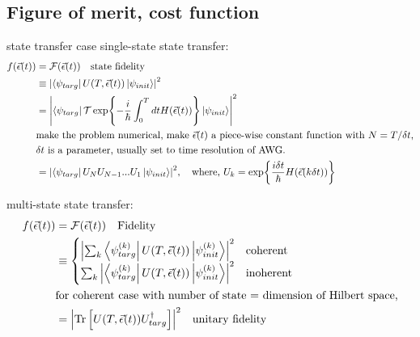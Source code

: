 \documentclass[12pt]{article}
\begin{document}
\subsection{Figure of merit, cost function}\label{sec:figure_of_merit}
state transfer case
single-state state transfer: 
\begin{align*}
    f(\vec{\epsilon}(t)) &= \mathcal{F}(\vec{\epsilon}(t)) \quad \text{state fidelity}\\
    &\equiv \abs{\bra{\psi_{targ}} U(T,\vec{\epsilon}(t)) \ket{\psi_{init}}}^2 \\
    &= \abs{\bra{\psi_{targ}} 
        \mathcal{T}\exp{-\frac{i}{\hbar}\int_0^T dt H(\vec{\epsilon}(t))}
        \ket{\psi_{init}}}^2 \\
    &\text{make the problem numerical, make $\vec{\epsilon}(t)$ a piece-wise constant function with $N=T/\delta t$,} \\
    &\text{$\delta t$ is a parameter, usually set to time resolution of AWG.} \\
    &= \abs{\bra{\psi_{targ}} 
        U_NU_{N-1}...U_1
        \ket{\psi_{init}}}^2, \quad \text{where, } U_k=\exp{\frac{i\delta t}{\hbar}H(\vec{\epsilon}(k\delta t))} \\
\end{align*}

multi-state state transfer:
\begin{align*}
    f(\vec{\epsilon}(t)) &= \mathcal{F}(\vec{\epsilon}(t)) \quad \text{Fidelity}\\
    &\equiv 
        \begin{cases}
            \abs{\sum_k \bra{\psi_{targ}^{(k)}} U(T,\vec{\epsilon}(t)) \ket{\psi_{init}^{(k)}}}^2 &\text{coherent} \\
            \sum_k \abs{\bra{\psi_{targ}^{(k)}} U(T,\vec{\epsilon}(t)) \ket{\psi_{init}^{(k)}}}^2 &\text{inoherent}
        \end{cases} \\
    &\text{for coherent case with number of state = dimension of Hilbert space,}\\
    &=\abs{\text{Tr}\left[U(T,\vec{\epsilon}(t))U_{targ}^{\dagger}\right]}^2 \quad \text{unitary fidelity}\\
\end{align*}

\end{document}
